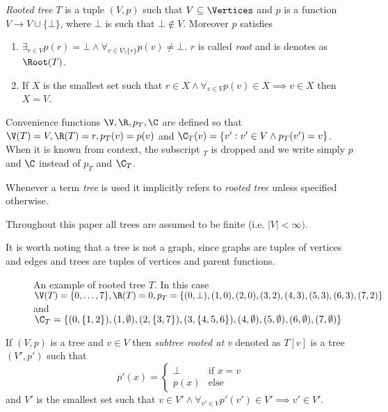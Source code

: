 \begin{defi}
    \emph{Rooted tree} $T$ is a tuple $(V, p)$ such that $V \subseteq \Vertices$ and $p$ is a function $V \to V \cup \{\bot\}$, where $\bot$ is such that $\bot \not\in V$. Moreover $p$ satisfies
    \begin{enumerate}
        \item $\exists_{r \in V} p(r) = \bot \land \forall_{v \in V\setminus\{r\}} p(v) \neq \bot$. $r$ is called \emph{root} and is denotes as $\Root(T)$.
        \item If $X$ is the smallest set such that $r \in X \land \forall_{v \in V} p(v) \in X \implies v \in X$ then $X = V$.
    \end{enumerate}
    Convenience functions $\V, \R, p_T, \C$ are defined so that $\V(T) = V, \R(T) = r, p_T(v) = p(v)$ and $\C_T(v) = \{v' : v' \in V \land p_T(v') = v\}$. When it is known from context, the subscript $_T$ is dropped and we write simply $p$ and $\C$ instead of $p_T$ and $\C_T$.
\end{defi}

Whenever a term \emph{tree} is used it implicitly refers to \emph{rooted tree} unless specified otherwise.

Throughout this paper all trees are assumed to be finite (i.e. $|V| < \infty)$.

It is worth noting that a tree is not a graph, since graphs are tuples of vertices and edges and trees are tuples of vertices and parent functions.

\begin{figure}[h]
    \centering
    \caption{An example of rooted tree $T$. In this case $\V(T) = \{0,\ldots,7\}, \R(T) = 0, p_T = \{(0, \bot), (1,0), (2,0), (3,2), (4,3), (5,3), (6,3), (7,2)\}$ and $\C_T = \{(0,\{1,2\}), (1,\emptyset), (2,\{3,7\}), (3,\{4,5,6\}), (4, \emptyset), (5, \emptyset), (6, \emptyset), (7, \emptyset)\}$}
\end{figure}

\begin{defi}
    If $(V,p)$ is a tree and $v \in V$ then \emph{subtree rooted at v} denoted as $T[v]$ is a tree $(V', p')$ such that
    \[
        p'(x) = \begin{cases}
            \bot & \text{if } x = v \\
            p(x) & \text{else}
        \end{cases}
    \]
    and $V'$ is the smallest set such that $v \in V' \land \forall_{v' \in V} p'(v') \in V' \implies v' \in V'$.
\end{defi}

